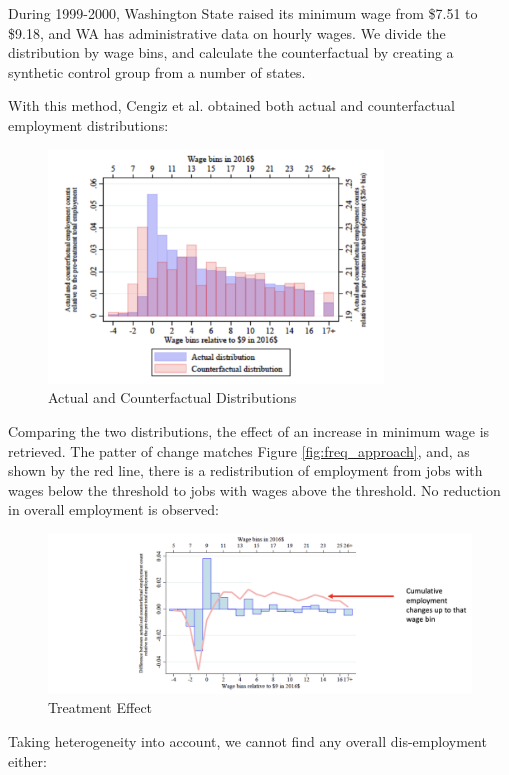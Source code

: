         During 1999-2000, Washington State raised its minimum wage from \$7.51 to \$9.18, and WA has administrative data on hourly wages. We divide the distribution by wage bins, and calculate the counterfactual by creating a synthetic control group from a number of states.

        With this method, Cengiz et al. obtained both actual and counterfactual employment distributions:
        \begin{figure}[H]
            \centering
            \includegraphics[width=3.5in]{images/ch2/Freq_approach_3.png}
            \caption{Actual and Counterfactual Distributions}
        \end{figure}
        Comparing the two distributions, the effect of an increase in minimum wage is retrieved. The patter of change matches Figure \ref{fig:freq_approach}, and, as shown by the red line, there is a redistribution of employment from jobs with wages below the threshold to jobs with wages above the threshold. No reduction in overall employment is observed:
        \begin{figure}[H]
            \centering
            \includegraphics[width=6.5in]{images/ch2/Freq_approach_4.png}
            \caption{Treatment Effect}
        \end{figure}
        Taking heterogeneity into account, we cannot find any overall dis-employment either:
